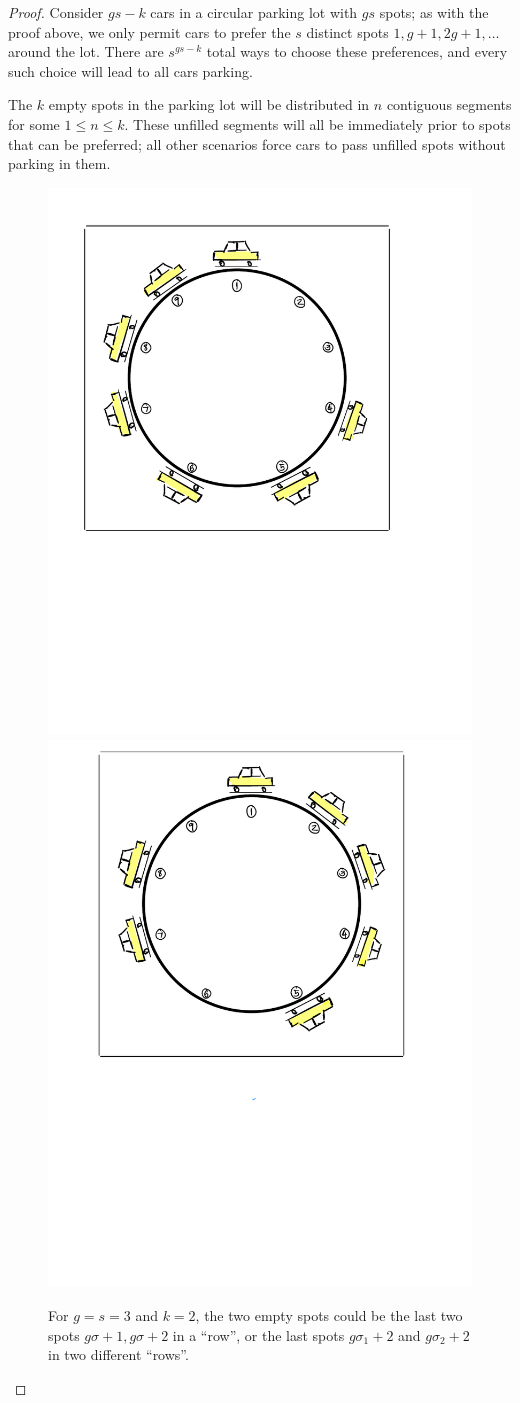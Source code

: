 \documentclass[12 pt]{amsart}
\theoremstyle{definition} %
\theoremstyle{remark} %
\begin{document}
\begin{proof}
    Consider $gs-k$ cars in a circular parking lot with $gs$ spots; as with the proof above, we only permit cars to prefer the $s$ distinct spots $1,g+1,2g+1,\ldots$ around the lot. There are $s^{gs-k}$ total ways to choose these preferences, and every such choice will lead to all cars parking.

    The $k$ empty spots in the parking lot will be distributed in $n$ contiguous segments for some $1\le n\le k.$ These unfilled segments will all be immediately prior to spots that can be preferred; all other scenarios force cars to pass unfilled spots without parking in them.

    \begin{figure}[H]
    	\centering
	\includegraphics[width = 0.45 \textwidth]{figures/modPFs3}
	\includegraphics[width = 0.45 \textwidth]{figures/modPFs4}
	\caption{For $g = s = 3$ and $k = 2$, the two empty spots could be the last two spots $g \sigma + 1, g \sigma + 2$ in a ``row'', or the last spots $g \sigma_{1} + 2$ and $g \sigma_{2} + 2$ in two different ``rows''.}
    \end{figure}


\end{proof}
\end{document}
